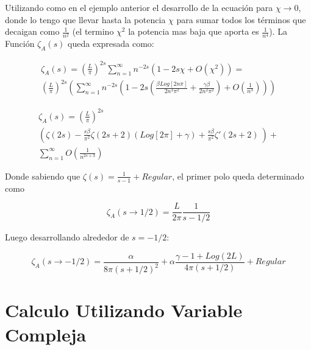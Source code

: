 Utilizando como en el ejemplo anterior el desarrollo de la ecuación para $\chi \rightarrow 0$, donde lo tengo que llevar hasta la potencia $ \chi  $ para sumar todos los términos que decaigan como $\frac{1}{n ^2}$ (el termino $\chi ^2 $ la potencia mas baja que aporta es $\frac{1}{n ^4}$). La Función $\zeta _A (s)$ queda expresada como:


\begin{equation}
\begin{array}{c}
    \zeta _A (s) = ( \frac{L}{\pi} ) ^{2 s}
    \sum _{n=1} ^{\infty} 
    n ^{-2s}
    \left(
    1 - 2 s \chi + O(\chi ^2)
    \right) =  \\
    ( \frac{L}{\pi} ) ^{2 s}
    \left(
    \sum _{n=1} ^{\infty} n ^{-2 s} 
    \left(
    1 - 2s \left(
    \frac{\beta Log[2 n \pi]}{2 n ^2 \pi ^2} + 
    \frac{\gamma \beta}{2 n ^2 \pi ^2} 
	\right) +
    O (\frac{1}{n ^{3} }  )
    \right)
    \right)
\end{array}
\end{equation}


\begin{equation}
\begin{array}{c}
    \zeta _A (s) = 
    \left( \frac{L }{ \pi } \right) ^{2 s}  \\
    \left(
    \zeta (2 s) -
	\frac{ s \beta}{ \pi ^2} \zeta (2s+2)
	\left(
	   Log[2  \pi ] + \gamma
	\right) +
    \frac{s \beta}{\pi ^2}
	\zeta '(2s+2) \
	\right) + \\
    \sum _{n=1} ^{\infty} O \left( \frac{1}{n ^{2s+3}} \right)
\end{array}
\end{equation}

Donde sabiendo que $\zeta(s) = \frac{1}{s-1} + Regular$, el primer polo queda determinado como

\begin{equation}
    \zeta _A (s \rightarrow 1/2) = \frac{L}{2 \pi} \frac{1}{s-1/2}    
\end{equation}

Luego desarrollando alrededor de $s=-1/2$:

\begin{equation}
    \zeta _A (s \rightarrow -1/2 ) =  \frac{\alpha}{8  \pi (s+1/2)^2} +
    \alpha \frac{ \gamma -1 + Log(2L )}{4  \pi (s+1/2)} + 
    Regular
\end{equation}

\section{Calculo Utilizando Variable Compleja}


